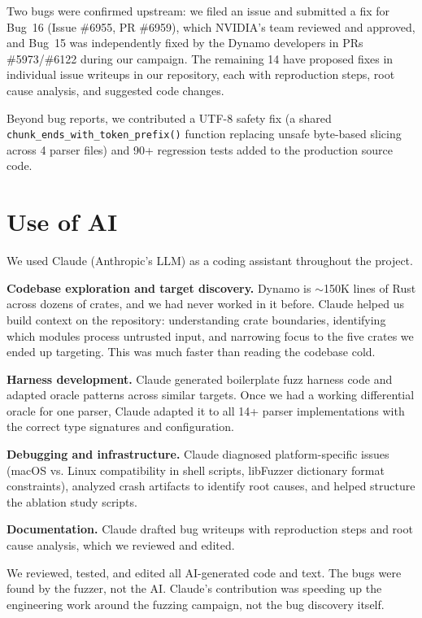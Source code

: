 \documentclass[11pt]{article}
\begin{document}
Two bugs were confirmed upstream: we filed an issue and submitted a fix for Bug~16 (Issue \#6955, PR \#6959), which NVIDIA's team reviewed and approved, and Bug~15 was independently fixed by the Dynamo developers in PRs \#5973/\#6122 during our campaign. The remaining 14 have proposed fixes in individual issue writeups in our repository, each with reproduction steps, root cause analysis, and suggested code changes.

Beyond bug reports, we contributed a UTF-8 safety fix (a shared \texttt{chunk\_ends\_with\_token\_prefix()} function replacing unsafe byte-based slicing across 4 parser files) and 90+ regression tests added to the production source code.

\section{Use of AI}

We used Claude (Anthropic's LLM) as a coding assistant throughout the project.

\textbf{Codebase exploration and target discovery.} Dynamo is $\sim$150K lines of Rust across dozens of crates, and we had never worked in it before. Claude helped us build context on the repository: understanding crate boundaries, identifying which modules process untrusted input, and narrowing focus to the five crates we ended up targeting. This was much faster than reading the codebase cold.

\textbf{Harness development.} Claude generated boilerplate fuzz harness code and adapted oracle patterns across similar targets. Once we had a working differential oracle for one parser, Claude adapted it to all 14+ parser implementations with the correct type signatures and configuration.

\textbf{Debugging and infrastructure.} Claude diagnosed platform-specific issues (macOS vs. Linux compatibility in shell scripts, libFuzzer dictionary format constraints), analyzed crash artifacts to identify root causes, and helped structure the ablation study scripts.

\textbf{Documentation.} Claude drafted bug writeups with reproduction steps and root cause analysis, which we reviewed and edited.

We reviewed, tested, and edited all AI-generated code and text. The bugs were found by the fuzzer, not the AI. Claude's contribution was speeding up the engineering work around the fuzzing campaign, not the bug discovery itself.
\end{document}
